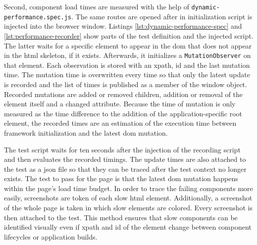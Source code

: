 \documentclass[a4paper, 12pt]{article}
\begin{document}
Second, component load times are measured with the help of \verb|dynamic-performance.spec.js|.
The same routes are opened after in initialization script is injected into the browser window.
Listings \ref{lst:dynamic-performance-spec} and \ref{lst:performance-recorder} show parts of the test definition and the injected script.
The latter waits for a specific element to appear in the \acrshort{dom} that does not appear in the \acrshort{html} skeleton, if it exists. %
Afterwards, it initializes a \verb|MutationObserver| on that element.
Each observation is stored with an xpath, id and the last mutation time.
The mutation time is overwritten every time so that only the latest update is recorded and the list of times is published as a member of the window object.
Recorded mutations are added or removed children, addition or removal of the element itself and a changed attribute.
Because the time of mutation is only measured as the time difference to the addition of the application-specific root element, the recorded times are an estimation of the execution time between framework initialization and the latest \acrshort{dom} mutation.

The test script waits for ten seconds after the injection of the recording script and then evaluates the recorded timings.
The update times are also attached to the test as a \acrshort{json} file so that they can be traced after the test context no longer exists.
The test to pass for the page is that the latest \acrshort{dom} mutation happens within the page's load time budget.
In order to trace the failing components more easily, screenshots are token of each slow \acrshort{html} element.
Additionally, a screenshot of the whole page is taken in which slow elements are colored. Every screenshot is then attached to the test.
This method ensures that slow components can be identified visually even if xpath and id of the element change between component lifecycles or application builds.
\end{document}
